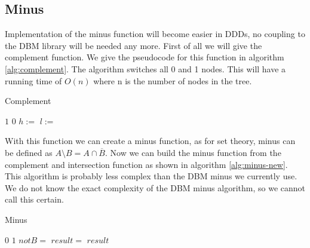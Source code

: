 \subsection{Minus}
Implementation of the minus function will become easier in DDDs, no coupling to the DBM library will be needed any more. First of all we will give the complement function. We give the pseudocode for this function in algorithm \ref{alg:complement}. The algorithm switches all 0 and 1 nodes. This will have a running time of $O(n)$ where n is the number of nodes in the tree. 

\begin{algorithm}
\caption{Complement}\label{alg:complement}
\begin{algorithmic}[1]
		\State \Return $1$
	\EndIf
		\State \Return $0$
	\EndIf
	\State $h :=$ 
	\State $l :=$ 
	\State \Return {}
	
\EndProcedure	
\end{algorithmic}
\end{algorithm}

With this function we can create a minus function, as for set theory, minus can be defined as $A \setminus B = A \cap \overline{B}$. Now we can build the minus function from the complement and intersection function as shown in algorithm \ref{alg:minus-new}. This algorithm is probably less complex than the DBM minus we currently use. We do not know the exact complexity of the DBM minus algorithm, so we cannot call this certain. 

\begin{algorithm}
\caption{Minus}\label{alg:minus-new}
\begin{algorithmic}[1]
		\State \Return $0$
	\EndIf
		\State \Return $1$
	\EndIf
	\State $notB = $
	\State $result =$ 
	\State \Return $result$
	
\EndProcedure	
\end{algorithmic}
\end{algorithm}
